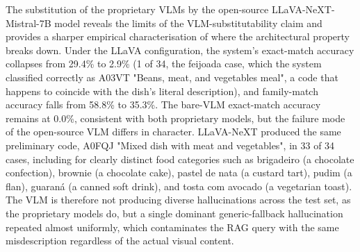 The substitution of the proprietary VLMs by the open-source LLaVA-NeXT-Mistral-7B model reveals the limits of the VLM-substitutability claim and provides a sharper empirical characterisation of where the architectural property breaks down. Under the LLaVA configuration, the system's exact-match accuracy collapses from 29.4\% to 2.9\% (1 of 34, the feijoada case, which the system classified correctly as A03VT "Beans, meat, and vegetables meal", a code that happens to coincide with the dish's literal description), and family-match accuracy falls from 58.8\% to 35.3\%. The bare-VLM exact-match accuracy remains at 0.0\%, consistent with both proprietary models, but the failure mode of the open-source VLM differs in character. LLaVA-NeXT produced the same preliminary code, A0FQJ "Mixed dish with meat and vegetables", in 33 of 34 cases, including for clearly distinct food categories such as brigadeiro (a chocolate confection), brownie (a chocolate cake), pastel de nata (a custard tart), pudim (a flan), guaraná (a canned soft drink), and tosta com avocado (a vegetarian toast). The VLM is therefore not producing diverse hallucinations across the test set, as the proprietary models do, but a single dominant generic-fallback hallucination repeated almost uniformly, which contaminates the RAG query with the same misdescription regardless of the actual visual content.


